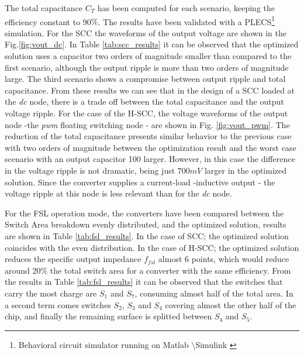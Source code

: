 The total capacitance $C_T$  has been computed for each scenario, keeping the efficiency constant to 90$\%$. The results have been validated with a PLECS\footnote[1]{Behavioral circuit simulator running on Matlab \textsuperscript{\textregistered} \textbackslash Simulink \textsuperscript{\textregistered}} simulation. For the SCC the waveforms of the output voltage are shown in the Fig.\ref{fig:vout_dc}. In Table \ref{tab:scc_results} it can be observed that the optimized solution uses a capacitor two orders of magnitude smaller than compared to the first scenario, although the output ripple is more than two orders of magnitude large. The third scenario shows a compromise between output ripple and total capacitance. From these results we can see that in the design of a SCC loaded at the \emph{dc} node, there is a trade off between the total capacitance and the output voltage ripple. For the case of the H-SCC, the voltage waveforms of the output node -the \emph{pwm} floating switching node - are shown in Fig. \ref{fig:vout_pwm}. The reduction of the total capacitance presents similar behavior to the previous case with two orders of magnitude between the optimization result and the worst case scenario with an output capacitor 100 larger. However, in this case the difference in the voltage ripple is not dramatic, being just $700mV$ larger in the optimized solution. Since the converter supplies a current-load -inductive output - the voltage ripple at this node is less relevant than for the \emph{dc} node.


%
%

 For the FSL operation mode, the converters have been compared between the Switch Area breakdown evenly distributed, and the optimized solution, results are shown in Table \ref{tab:fsl_results}. In the case of SCC; the optimized solution coincides with the even distribution. In the case of H-SCC; the optimized solution reduces the specific output impedance $f_{fsl}$  almost 6 points, which would reduce around 20$\%$ the total switch area for a converter with the same efficiency. From the results in Table \ref{tab:fsl_results} it can be observed that the switches that carry the most charge are $S_1$ and $S_7$, consuming almost half of the total area. In a second term comes switches $S_2$, $S_3$ and $S_4$ covering almost the other half of the chip, and finally the remaining surface is splitted between $S_4$ and $S_5$.

